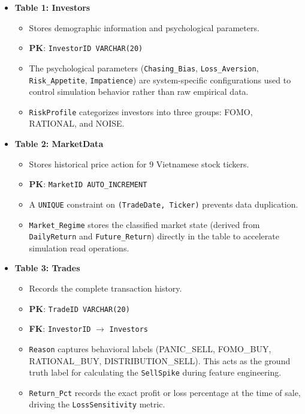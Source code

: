 \begin{itemize}
    \item \textbf{Table 1: Investors}
    \begin{itemize}
        \item Stores demographic information and psychological parameters.
        \item \textbf{PK}: \texttt{InvestorID VARCHAR(20)}
        \item The psychological parameters (\texttt{Chasing\_Bias}, \texttt{Loss\_Aversion}, \texttt{Risk\_Appetite}, \texttt{Impatience}) are system-specific configurations used to control simulation behavior rather than raw empirical data.
        \item \texttt{RiskProfile} categorizes investors into three groups: FOMO, RATIONAL, and NOISE.
    \end{itemize}

    \item \textbf{Table 2: MarketData}
    \begin{itemize}
        \item Stores historical price action for 9 Vietnamese stock tickers.
        \item \textbf{PK}: \texttt{MarketID AUTO\_INCREMENT}
        \item A \texttt{UNIQUE} constraint on \texttt{(TradeDate, Ticker)} prevents data duplication.
        \item \texttt{Market\_Regime} stores the classified market state (derived from \texttt{DailyReturn} and \texttt{Future\_Return}) directly in the table to accelerate simulation read operations.
    \end{itemize}

    \item \textbf{Table 3: Trades}
    \begin{itemize}
        \item Records the complete transaction history.
        \item \textbf{PK}: \texttt{TradeID VARCHAR(20)}
        \item \textbf{FK}: \texttt{InvestorID} $\rightarrow$ \texttt{Investors}
        \item \texttt{Reason} captures behavioral labels (PANIC\_SELL, FOMO\_BUY, RATIONAL\_BUY, DISTRIBUTION\_SELL). This acts as the ground truth label for calculating the \texttt{SellSpike} during feature engineering.
        \item \texttt{Return\_Pct} records the exact profit or loss percentage at the time of sale, driving the \texttt{LossSensitivity} metric.
    \end{itemize}


\end{itemize}
